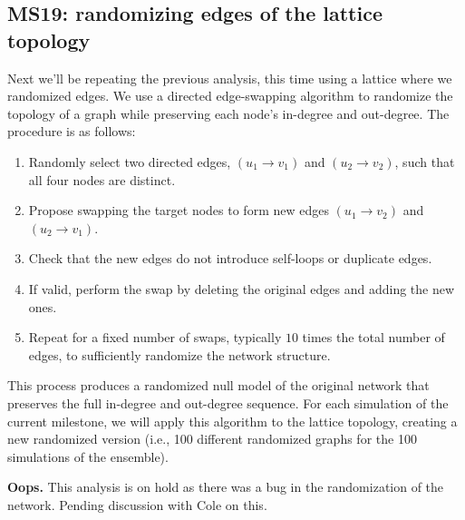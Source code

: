 \documentclass[11pt]{article}
\newcommand{\important}[2]{\begin{importantBox} \textbf{#1} #2 \end{importantBox}}
\begin{document}
\clearpage

\subsection{MS19: randomizing edges of the lattice topology}
\label{subsec:MS19}

Next we’ll be repeating the previous analysis, this time using a lattice where we randomized edges. We use a directed edge-swapping algorithm to randomize the topology of a graph while preserving each node's in-degree and out-degree. The procedure is as follows:
\begin{enumerate}
    \item Randomly select two directed edges, $(u_1 \rightarrow v_1)$ and $(u_2 \rightarrow v_2)$, such that all four nodes are distinct.
    \item Propose swapping the target nodes to form new edges $(u_1 \rightarrow v_2)$ and $(u_2 \rightarrow v_1)$.
    \item Check that the new edges do not introduce self-loops or duplicate edges.
    \item If valid, perform the swap by deleting the original edges and adding the new ones.
    \item Repeat for a fixed number of swaps, typically $10$ times the total number of edges, to sufficiently randomize the network structure.
\end{enumerate}

This process produces a randomized null model of the original network that preserves the full in-degree and out-degree sequence. For each simulation of the current milestone, we will apply this algorithm to the lattice topology, creating a new randomized version (i.e., 100 different randomized graphs for the 100 simulations of the ensemble).\\

\important{Oops.}{This analysis is on hold as there was a bug in the randomization of the network. Pending discussion with Cole on this.}

\clearpage
\end{document}
